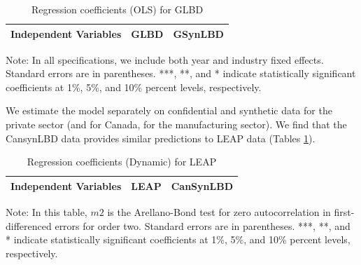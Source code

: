 \begin{table}[H]
  \centering
 \caption{Regression coefficients (OLS) for GLBD} \label{OLS} \medskip
\renewcommand{\arraystretch}{1}
\begin{tabular}{l|c |c}
\toprule
\textbf{Independent Variables}&\textbf{GLBD} &  \textbf{GSynLBD}\\
\midrule

   \bottomrule
  \end{tabular} 
\begin{tablenotes}
\small
\item Note: In all specifications, we include both year and industry fixed effects. Standard errors are in parentheses.  ***, **, and * indicate statistically significant coefficients at 1\%, 5\%, and 10\% percent levels, respectively.
 \end{tablenotes}
\end{table}

We estimate the model separately on confidential and synthetic data for the private sector (and for Canada, for the manufacturing sector). We find that the CansynLBD data provides similar predictions to LEAP data (Tables  \ref{OLS}). 

\begin{table}[H]
  \centering
\begin{threeparttable}
 \caption{Regression coefficients (Dynamic) for LEAP} \label{Dynamic - GMM} \medskip
\renewcommand{\arraystretch}{1}
\begin{tabular}{l|c c| c c}
\toprule
\textbf{Independent Variables}&\multicolumn{2}{c|}{\textbf{LEAP}} &  \multicolumn{2}{c}{\textbf{CanSynLBD}}\\
\midrule

   \bottomrule
  \end{tabular} 
\begin{tablenotes}
\small
\item Note: In this table, $m2$ is the Arellano-Bond test for zero autocorrelation in first-differenced errors for order two. Standard errors are in parentheses. ***, **, and * indicate statistically significant coefficients at 1\%, 5\%, and 10\% percent levels, respectively.
 \end{tablenotes}
 \end{threeparttable}
\end{table}

